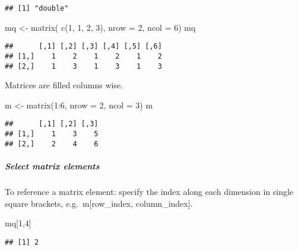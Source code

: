 \documentclass[
]{article}
\newenvironment{Shaded}{\begin{snugshade}}{\end{snugshade}}
\newcommand{\AttributeTok}[1]{\textcolor[rgb]{0.77,0.63,0.00}{#1}}
\newcommand{\DecValTok}[1]{\textcolor[rgb]{0.00,0.00,0.81}{#1}}
\newcommand{\FunctionTok}[1]{\textcolor[rgb]{0.00,0.00,0.00}{#1}}
\newcommand{\NormalTok}[1]{#1}
\newcommand{\OtherTok}[1]{\textcolor[rgb]{0.56,0.35,0.01}{#1}}
\newcommand{\SpecialCharTok}[1]{\textcolor[rgb]{0.00,0.00,0.00}{#1}}
\begin{document}
\begin{verbatim}
## [1] "double"
\end{verbatim}

\begin{Shaded}
\begin{Highlighting}[]
\NormalTok{mq }\OtherTok{\textless{}{-}} \FunctionTok{matrix}\NormalTok{(}
  \FunctionTok{c}\NormalTok{(}\DecValTok{1}\NormalTok{, }\DecValTok{1}\NormalTok{, }\DecValTok{2}\NormalTok{, }\DecValTok{3}\NormalTok{),}
  \AttributeTok{nrow =} \DecValTok{2}\NormalTok{,}
  \AttributeTok{ncol =} \DecValTok{6}\NormalTok{)}
\NormalTok{mq}
\end{Highlighting}
\end{Shaded}

\begin{verbatim}
##      [,1] [,2] [,3] [,4] [,5] [,6]
## [1,]    1    2    1    2    1    2
## [2,]    1    3    1    3    1    3
\end{verbatim}

Matrices are filled columns wise.

\begin{Shaded}
\begin{Highlighting}[]
\NormalTok{m }\OtherTok{\textless{}{-}} \FunctionTok{matrix}\NormalTok{(}\DecValTok{1}\SpecialCharTok{:}\DecValTok{6}\NormalTok{, }\AttributeTok{nrow =} \DecValTok{2}\NormalTok{, }\AttributeTok{ncol =} \DecValTok{3}\NormalTok{)}
\NormalTok{m}
\end{Highlighting}
\end{Shaded}

\begin{verbatim}
##      [,1] [,2] [,3]
## [1,]    1    3    5
## [2,]    2    4    6
\end{verbatim}

\hypertarget{select-matrix-elements}{%
\subparagraph{Select matrix elements}\label{select-matrix-elements}}

To reference a matrix element: specify the index along each dimension in
single square brackets, e.g.~m{[}row\_index, column\_index{]}.

\begin{Shaded}
\begin{Highlighting}[]
\NormalTok{mq[}\DecValTok{1}\NormalTok{,}\DecValTok{4}\NormalTok{]}
\end{Highlighting}
\end{Shaded}

\begin{verbatim}
## [1] 2
\end{verbatim}
\end{document}
